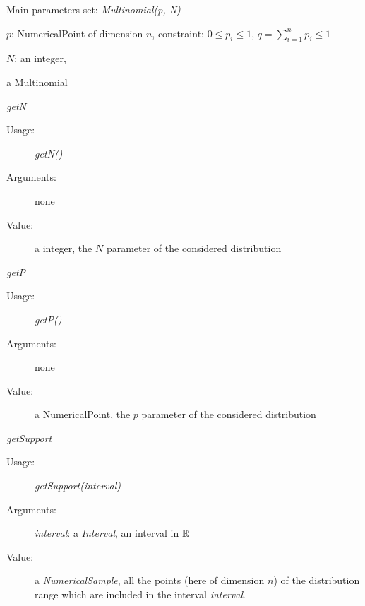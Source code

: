 \begin{description}

\item[Usage:] Main parameters set: \textit{Multinomial(p, N)}

\item[Arguments:]  \rule{0pt}{1em}
\begin{description}
\item $p$:  NumericalPoint of dimension $n$,
constraint: $0\leq p_i \leq 1$, $\displaystyle q = \sum_{i=1}^n p_i \leq 1$
\item $N$:  an integer,
\end{description}

\item[Value:] a Multinomial

\item[Some methods:] \rule{0pt}{1em}
\begin{description}

\item \textit{getN}
\begin{description}
\item[Usage:] \textit{getN()}
\item[Arguments:] none
\item[Value:]  a integer, the  $N$ parameter of the considered distribution
\end{description}
\bigskip

\item \textit{getP}
\begin{description}
\item[Usage:] \textit{getP()}
\item[Arguments:] none
\item[Value:]  a NumericalPoint, the  $p$ parameter of the considered distribution
\end{description}
\bigskip

\item \textit{getSupport}
\begin{description}
\item[Usage:] \textit{getSupport(interval)}
\item[Arguments:] \textit{interval}: a \textit{Interval}, an interval in ${\mathbb R}$
\item[Value:]  a \textit{NumericalSample}, all the points (here of dimension $n$) of the distribution range which are included in the interval \textit{interval}.
\end{description}
\end{description}


\end{description}
